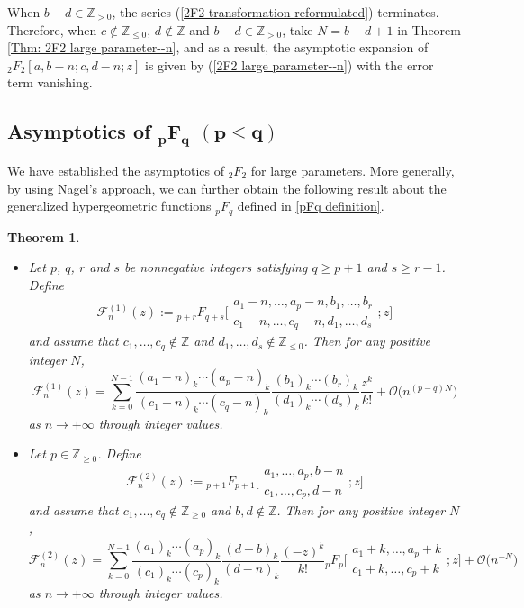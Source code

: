 \documentclass[pdftex]{sigma}
\numberwithin{equation}{section}
\newtheorem{Theorem}{Theorem}[section]
\newcommand{\ZZ}{\ensuremath{\mathbb{Z}}}
\newcommand{\mo}{\mathcal{O}}
\begin{document}
\begin{Remark}
	When $b-d\in\ZZ_{>0}$, the series (\ref{2F2 transformation reformulated}) terminates. Therefore, when $c\notin\ZZ_{\leqslant 0}$, $d\notin\ZZ$ and $b-d\in\ZZ_{>0}$, take $N=b-d+1$ in Theorem \ref{Thm: 2F2 large parameter--n}, and as a result, the asymptotic expansion of $_2F_2[a,b-n;c,d-n;z]$ is given by (\ref{2F2 large parameter--n}) with the error term vanishing.
\end{Remark}

\subsection[Asymptotics of \_pF\_q (p leqslant q)]{Asymptotics of $\boldsymbol{_pF_q}$ $\boldsymbol{(p\leqslant q)}$}

We have established the asymptotics of $_2F_2$ for large parameters. More generally, by using Nagel's approach, we can further obtain the following result about the generalized hypergeometric functions $_{p}F_{q}$ defined in \eqref{pFq definition}.

\begin{Theorem}\label{Thm: pFq large parameters}
\quad
	\begin{itemize}\itemsep=0pt	
		\item[$(1)$] Let $p$, $q$, $r$ and $s$ be nonnegative integers satisfying $q\geqslant p+1$ and $s\geqslant r-1$. Define
		\[\mathcal{F}_n^{(1)}(z):={}_{p+r}F_{q+s}\biggl[\begin{matrix}
			a_1-n,\dots,a_p-n,b_1,\dots,b_r\\
			c_1-n,\dots,c_q-n,d_1,\dots,d_s
		\end{matrix};z\biggr]\]
		and assume that $c_1,\dots,c_q\notin\ZZ$ and $d_1,\dots,d_s\notin\ZZ_{\leqslant 0}$. Then for any positive integer $N$,
		\[\mathcal{F}_n^{(1)}(z)=\sum_{k=0}^{N-1}\frac{(a_1-n)_k\cdots(a_p-n)_k}{(c_1-n)_k\cdots(c_q-n)_k}\frac{(b_1)_k\cdots(b_r)_k}{(d_1)_k
 \cdots(d_s)_k}\frac{z^k}{k!}+\mo\big(n^{(p-q)N}\big)\]
		as $n\to +\infty$ through integer values.
		
		\item[$(2)$] Let $p\in\ZZ_{\geqslant 0}$. Define
			\[\mathcal{F}_n^{(2)}(z):={}_{p+1}F_{p+1}\biggl[\begin{matrix}
				a_1,\dots,a_p,b-n\\
				c_1,\dots,c_p,d-n
			\end{matrix};z\biggr]\]
			and assume that $c_1,\dots,c_q\notin\ZZ_{\geqslant 0}$ and $b,d\notin\ZZ$. Then for any positive integer $N$,
			\[\mathcal{F}_n^{(2)}(z)=\sum_{k=0}^{N-1}\frac{(a_1)_k\cdots(a_p)_k}{(c_1)_k\cdots(c_p)_k}
 \frac{(d-b)_k}{(d-n)_k}\frac{(-z)^k}{k!}{}_{p}F_{p}\biggl[\begin{matrix}
				a_1+k,\dots,a_p+k\\
				c_1+k,\dots,c_p+k
			\end{matrix};z\biggr]+\mo\big(n^{-N}\big)\]
			as $n\to +\infty$ through integer values.
	\end{itemize}
\end{Theorem}
\end{document}
